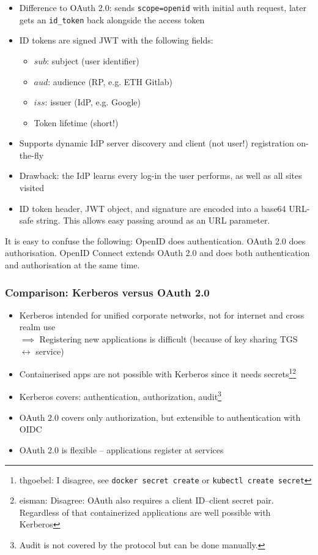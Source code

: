 \begin{itemize}
    \item Difference to OAuth 2.0: sends \texttt{scope=openid} with initial auth request, later gets an \texttt{id\_token} back alongside the access token
    \item ID tokens are signed JWT with the following fields:
    \begin{itemize}
        \item $sub$: subject (user identifier)
        \item $aud$: audience (RP, e.g. ETH Gitlab)
        \item $iss$: issuer (IdP, e.g. Google)
        \item Token lifetime (short!)
    \end{itemize}
    \item Supports dynamic IdP server discovery and client (not user!) registration on-the-fly
    \item Drawback: the IdP learns every log-in the user performs, as well as all sites visited
    \item ID token header, JWT object, and signature are encoded into a base64 URL-safe string. This allows easy passing around as an URL parameter.
\end{itemize}

It is easy to confuse the following: OpenID does authentication. OAuth 2.0 does authorisation. OpenID Connect extends OAuth 2.0 and does both authentication and authorisation at the same time.

\subsubsection{Comparison: Kerberos versus OAuth 2.0}
\begin{itemize}
    \item Kerberos intended for unified corporate networks, not for internet and cross realm use\\ $\implies$ Registering new applications is difficult (because of key sharing TGS $\leftrightarrow$ service)
    \item Containerised apps are not possible with Kerberos since it needs secrets\footnote{thgoebel: I disagree, see \texttt{docker secret create} or \texttt{kubectl create secret}}\footnote{eisman: Disagree: OAuth also requires a client ID--client secret pair. Regardless of that containerized applications are well possible with Kerberos}
    \item Kerberos covers: authentication, authorization, audit\footnote{Audit is not covered by the protocol but can be done manually.}
    \item OAuth 2.0 covers only authorization, but extensible to authentication with OIDC
    \item OAuth 2.0 is flexible – applications register at services 
\end{itemize}



